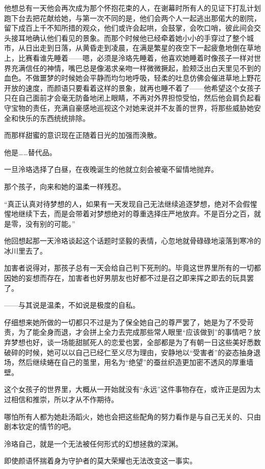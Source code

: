 \documentclass[UTF8, scheme = chinese, openany]{ctexbook}
\begin{document}
他想总有一天他会再次成为那个怀抱花束的人，在谢幕时所有人的见证下打乱计划跑下台去把花献给她，与第一次不同的是，他们会两个人一起逃出那偌大的剧院，留下成百上千不知所措的观众，他们或许会起哄，会鼓掌，会吹口哨，彼此间会交头接耳地确认他们看见的景象。而那个时候他已经牵着她小小的手穿过了整个城市，从日出走到日落，从黄昏走到凌晨，在满是繁星的夜空下一起疲惫地倒在草地上，比赛看谁先睡着——嗯，必须是泠珞先睡着，他喜欢她睡着时像孩子一样对世界充满信任的神情，嘴巴总是像渴求亲吻一样微微撅起，脸颊泛出白天里见不到的血色。不做噩梦的时候她会平静而均匀地呼吸，轻柔的吐息仿佛会催进草地上野花开放的速度，而颜语只要看着这样的景象，就再也睡不着了——他希望这个女孩子只在自己面前才会毫无防备地闭上眼睛，不再对外界担惊受怕，然后他会肩负起看守宝物的责任，充满自豪感地巡视这个对她来说并不友善的世界，将那些威胁她安全和快乐的东西统统排除。

而那样甜蜜的意识现在正随着日光的加强而涣散。

他是……替代品。

一旦泠珞选择了白昼，在夜晚诞生的他就立刻会被毫不留情地抛弃。

那个孩子，向来和她的温柔一样残忍。

“真正认真对待梦想的人，如果有一天发现自己无法继续追逐梦想，绝对不会假惺惺地继续下去，而是会带着对梦想绝对的尊重选择庄严地放弃。不是百分之百，就是零，没有别的可能。”

他回想起那一天泠珞谈起这个话题时坚毅的表情，心忽地就骨碌碌地滚落到寒冷的冰川里去了。

加害者说得对，那孩子总有一天会给自己判下死刑的。毕竟这世界里所有的一切都因她的妄想而存在，加害者也好男朋友也好都不过是召之即来挥之即去的玩具罢了。

——与其说是温柔，不如说是极度的自私。

仔细想来她所做的一切都只不过是为了保全她自己的尊严罢了，她是为了不受苛责，为了能全身而退，才会拼上全力去完成那些常人眼里“应该做到”的事情吧？放弃梦想也好，谈一场能甜腻死人的恋爱也罢，全部都是为了有朝一日这些美好悉数破碎的时候，她可以以自己已经仁至义尽为理由，安静地以“受害者”的姿态抽身退场，然后继续蜷在自己的茧里，用名为“绝望”的蚕丝织造更加密不透风的厚重墙壁。

这个女孩子的世界里，大概从一开始就没有“永远”这件事物存在，或许正是因为太过相信和推崇，所以才从不作期待。

哪怕所有人都为她赴汤蹈火，她也会把这些配角的努力看作是与自己无关的、只由剧本钦定的情节的吧。

泠珞自己，就是一个无法被任何形式的幻想拯救的深渊。

即使颜语怀揣着身为守护者的莫大荣耀也无法改变这一事实。
\end{document}
